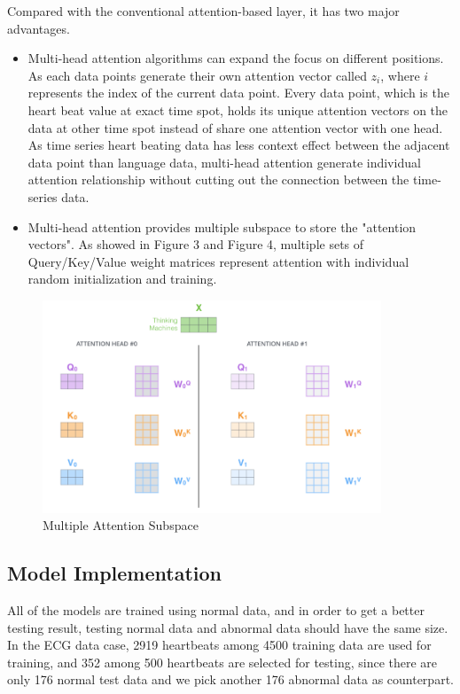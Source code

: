 \documentclass{article}
\begin{document}
Compared with the conventional attention-based layer, it has two major advantages.

\begin{itemize}
    \item Multi-head attention algorithms can expand the focus on different positions. As each data points generate their own attention vector called $z_{i}$, where $i$ represents the index of the current data point. Every data point, which is the heart beat value at exact time spot, holds its unique attention vectors on the data at other time spot instead of share one attention vector with one head. As time series heart beating data has less context effect between the adjacent data point than language data, multi-head attention generate individual attention relationship without cutting out the connection between the time-series data. 
    \item Multi-head attention provides multiple subspace to store the "attention vectors". As showed in Figure 3 and Figure 4, multiple sets of Query/Key/Value weight matrices represent attention with individual random initialization and training.
\end{itemize}

\begin{figure}
    \centering
    \includegraphics[width=0.9\textwidth]{images/Multiple Attention Subspace.png}
    \caption{Multiple Attention Subspace}
\end{figure}

\subsection{Model Implementation}

All of the models are trained using normal data, and in order to get a better testing result, testing normal data and abnormal data should have the same size. In the ECG data case, 2919 heartbeats among 4500 training data are used for training, and 352 among 500 heartbeats are selected for testing, since there are only 176 normal test data and we pick another 176 abnormal data as counterpart.
\end{document}
